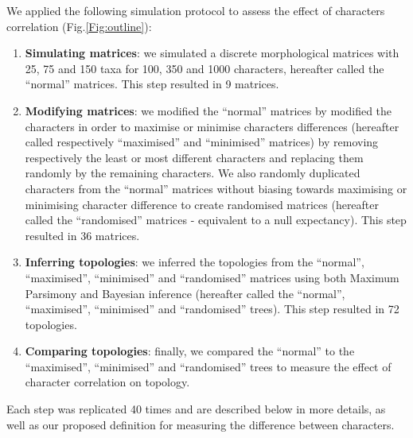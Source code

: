 \documentclass[12pt,letterpaper]{article}
\begin{document}
We applied the following simulation protocol to assess the effect of characters correlation (Fig.\ref{Fig:outline}):
\begin{enumerate}
    \item \textbf{Simulating matrices}: we simulated a discrete morphological matrices with 25, 75 and 150 taxa for 100, 350 and 1000 characters, hereafter called the ``normal'' matrices. This step resulted in 9 matrices.
    \item \textbf{Modifying matrices}: we modified the ``normal'' matrices by modified the characters in order to maximise or minimise characters differences (hereafter called respectively ``maximised'' and ``minimised'' matrices) by removing respectively the least or most different characters and replacing them randomly by the remaining characters.
    We also randomly duplicated characters from the ``normal'' matrices without biasing towards maximising or minimising character difference to create randomised matrices (hereafter called the ``randomised'' matrices - equivalent to a null expectancy). This step resulted in 36 matrices.
    \item \textbf{Inferring topologies}: we inferred the topologies from the ``normal'', ``maximised'', ``minimised'' and ``randomised'' matrices using both Maximum Parsimony and Bayesian inference (hereafter called the ``normal'', ``maximised'', ``minimised'' and ``randomised'' trees). This step resulted in 72 topologies.
    \item \textbf{Comparing topologies}: finally, we compared the ``normal'' to the ``maximised'', ``minimised'' and ``randomised'' trees to measure the effect of character correlation on topology.
\end{enumerate}
Each step was replicated 40 times and are described below in more details, as well as our proposed definition for measuring the difference between characters.
\end{document}
